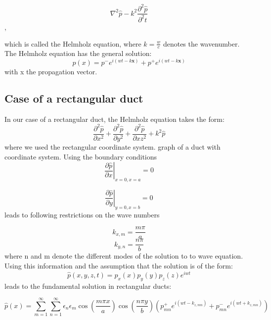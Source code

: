 \documentclass[11pt]{report} %
\begin{document}
\begin{equation}
\nabla^2 \hat{p}-k^2 \frac{\partial^2\hat{p}}{\partial^2t}
\end{equation},  

which is called the Helmholz equation, where $k=\frac{w}{c}$ denotes the wavenumber. 
The Helmholz equation has the general solution:
\begin{equation}
p(x)=p^{-}e^{i(wt-k\textbf{x})}+p^{+}e^{i(wt-k\textbf{x})}
\end{equation}
with x the propagation vector. 

\subsection{Case of a rectangular duct}
In our case of a rectangular duct, the Helmholz equation takes the form: 
\begin{equation}
\frac{\partial^2\hat{p}}{\partial x^2}+\frac{\partial^2\hat{p}}{\partial y^2}+\frac{\partial^2\hat{p}}{\partial xz^2}+k^2\hat{p}
\end{equation}
where we used the rectangular coordinate system. 
graph of a duct with coordinate system.
Using the boundary conditions 
\begin{equation}
\left.\frac{\partial\hat{p}}{\partial x}\right\rvert_{x=0,x=a}=0
\end{equation}

\begin{equation}
\left.\frac{\partial\hat{p}}{\partial y}\right\rvert_{y=0,x=b}=0
\end{equation}
leads to following restrictions on the wave numbers 

\begin{equation}
k_{x,m}=\frac{m\pi}{a}
\end{equation}
\begin{equation}
k_{y,n}=\frac{n\pi}{b}
\end{equation}
where n and m denote the different modes of the solution to to wave equation. 
Using this information and the assumption that the solution is of the form: 
\begin{equation}
\hat{p}(x,y,z,t)=p_{x}(x)p_{y}(y)p_{z}(z)e^{iwt}
\end{equation}
leads to the fundamental solution in rectangular ducts: 

\begin{equation} \label{eqn:ductmodes}
\hat{p}(x)=\sum\limits_{m=1}^\infty\sum\limits_{n=1}^\infty \epsilon_{n}\epsilon_{m}\cos(\frac{m\pi x}{a})\cos(\frac{n\pi y}{b})\left( p_{mn}^{+} e^{i(wt-k_{z,mn})}+p_{mn}^{-}e^{i(wt+k_{z,mn})} \right)
\end{equation}
\end{document}
